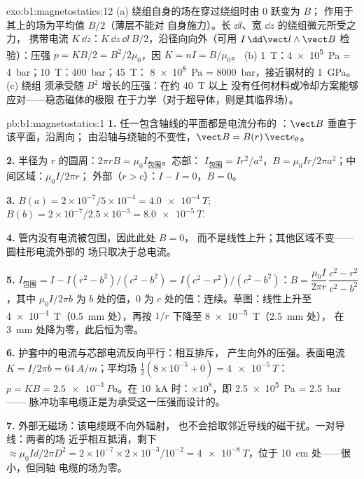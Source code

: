 \begin{solution}{exo:b1:magnetostatics:12}
(a) 绕组自身的场在穿过绕组时由 $0$ 跃变为 $B$；
作用于其上的场为平均值 $B/2$（薄层不能对
自身施力）。长 $\dd l$、宽 $\dd z$ 的绕组微元所受之力，
携带电流 $K\,\dd z$：$K\,\dd z\,\dd l\,B/2$，沿径向向外（可用 $I\,\dd\vect l
\wedge\vect B$ 检验）：压强 $p = KB/2 = B^2/2\mu_0$，因 $K = nI = B/\mu_0$。
(b) \qty{1}{T}：\qty{4e5}{Pa} = \qty{4}{bar}；\qty{10}{T}：\qty{400}{bar}；\qty{45}{T}：
\qty{8e8}{Pa} = \qty{8000}{bar}，接近钢材的 \qty{1}{GPa}。(c) 绕组
须承受随 $B^2$ 增长的压强：在约 \qty{40}{T} 以上
没有任何材料或冷却方案能够应对——稳态磁体的极限
在于力学（对于超导体，则是其临界场）。
\end{solution}

\begin{solution}{pb:b1:magnetostatics:1}
\textbf{1.} 任一包含轴线的平面都是电流分布的
：$\vect B$ 垂直于该平面，沿周向；
由沿轴与绕轴的不变性，$\vect B = B(r)\,\vect e_\theta$。

\textbf{2.} 半径为 $r$ 的圆周：$2\pi rB = \mu_0I_{\text{包围}}$。芯部：
$I_{\text{包围}} = Ir^2/a^2$，$B = \mu_0Ir/2\pi a^2$；中间区域：$\mu_0I/2\pi r$；
外部（$r > c$）：$I - I = 0$，$B = 0$。

\textbf{3.} $B(a) = 2 \times 10^{-7}/5 \times 10^{-4} = \qty{4.0e-4}{T}$; $B(b) = 2 \times
10^{-7}/2.5 \times 10^{-3} = \qty{8.0e-5}{T}$.

\textbf{4.} 管内没有电流被包围，因此此处 $B = 0$，
而不是线性上升；其他区域不变——圆柱形电流外部的
场只取决于总电流。

\textbf{5.} $I_{\text{包围}} = I - I(r^2 - b^2)/(c^2 - b^2) = I(c^2 - r^2)/(c^2 -
b^2)$：$B = \dfrac{\mu_0I}{2\pi r}\,\dfrac{c^2 - r^2}{c^2 - b^2}$，其中 $\mu_0I/2\pi b$ 为
$b$ 处的值，$0$ 为 $c$ 处的值：连续。草图：线性上升至
\qty{4e-4}{T}（\qty{0.5}{mm} 处），再按 $1/r$ 下降至 \qty{8e-5}{T}（\qty{2.5}{mm} 处），
在 \qty{3}{mm} 处降为零，此后恒为零。

\textbf{6.} 护套中的电流与芯部电流反向平行：相互排斥，
产生向外的压强。表面电流 $K = I/2\pi b = \qty{64}{A/m}$；平均场
$\tfrac12(8 \times 10^{-5} + 0) = \qty{4e-5}{T}$：$p = KB = \qty{2.5e-3}{Pa}$。在
\qty{10}{kA} 时：$\times10^8$，即 \qty{2.5e5}{Pa} = \qty{2.5}{bar}——
脉冲功率电缆正是为承受这一压强而设计的。

\textbf{7.} 外部无磁场：该电缆既不向外辐射，
也不会拾取邻近导线的磁干扰。一对导线：两者的场
近乎相互抵消，剩下 $\approx \mu_0Id/2\pi D^2 = 2 \times 10^{-7} \times 2 \times
10^{-3}/10^{-2} = \qty{4e-8}{T}$，位于 \qty{10}{cm} 处——很小，但同轴
电缆的场为零。


\end{solution}
